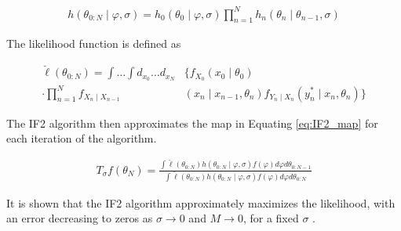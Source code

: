 \documentclass[twoside,openright]{report}
\begin{document}
\begin{align} \label{eq:allprecomb}
    h(\theta_{0:N} \mid \varphi, \sigma ) = h_0(\theta_{0} \mid \varphi, \sigma ) \prod_{n=1}^{N} h_n(\theta_{n} \mid \theta_{n-1}, \sigma )
\end{align}

The likelihood function is defined as

\begin{align}
    \breve{\ell} ( \theta_{0:N} ) = \int \ldots \int d_{x_0} \ldots d_{x_N} & \Big\{ f_{X_0} (x_0 \mid \theta_0 ) \\ \cdot \prod_{n=1}^{N} f_{X_n \mid X_{n-1} } & (x_n \mid x_{n-1} , \theta_n ) f_{Y_n \mid X_n}  (y_n^{\ast} \mid x_n , \theta_n )  \Big\} \nonumber
\end{align}

The IF2 algorithm then approximates the map in Equating \ref{eq:IF2_map} for each iteration of the algorithm. 

\begin{align} \label{eq:IF2_map}
    T_{\sigma} f( \theta_N ) = \frac{\int \breve{\ell} ( \theta_{0:N} )  h(\theta_{0:N} \mid \varphi, \sigma ) f(\varphi) d\varphi d\theta_{0:N-1}   }{ \int \breve{\ell} ( \theta_{0:N} )  h(\theta_{0:N} \mid \varphi, \sigma ) f(\varphi) d\varphi d\theta_{0:N} }
\end{align}

It is shown that the IF2 algorithm approximately maximizes the likelihood, with an error decreasing to zeros as $\sigma \rightarrow 0$ and $M \rightarrow 0$, for a fixed $\sigma$ \cite{ionides2015inference}. 
\end{document}
